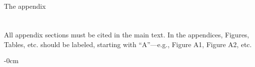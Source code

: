 \documentclass[jmse,article,submit,pdftex,moreauthors]{Definitions/mdpi}
\begin{document}
\appendixstart
\appendix
\section[\appendixname~\thesection]{}
\subsection[\appendixname~\thesubsection]{}
The appendix 

\section[\appendixname~\thesection]{}
All appendix sections must be cited in the main text. In the appendices, Figures, Tables, etc. should be labeled, starting with ``A''---e.g., Figure A1, Figure A2, etc.

\begin{adjustwidth}{-\extralength}{0cm}

\nocite{*}



\end{adjustwidth}
\end{document}
